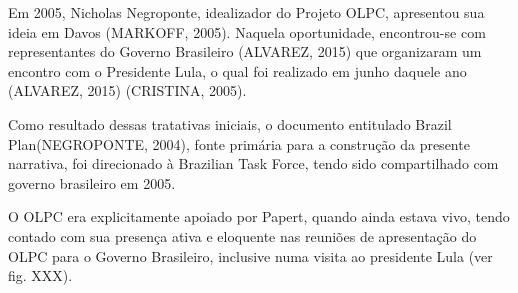 \documentclass[
12pt,		%
openright,	%
twoside,  %
a4paper,			%
chapter=TITLE,		%
english,			%
french,				%
spanish,			%
brazil				%
]{USPSC-classe/USPSC}
\begin{document}
Em 2005, Nicholas Negroponte, idealizador do Projeto OLPC, apresentou sua ideia em Davos (MARKOFF, 2005). Naquela oportunidade, encontrou-se com representantes do Governo Brasileiro (ALVAREZ, 2015) que organizaram um encontro com o Presidente Lula, o qual foi realizado em junho daquele ano (ALVAREZ, 2015) (CRISTINA, 2005).










Como resultado dessas tratativas iniciais, o documento entitulado \textquotedbl Brazil Plan\textquotedbl   (NEGROPONTE, 2004), fonte prim\'aria para a constru\c{c}\~ao da presente narrativa, foi direcionado \`a \textquotedbl Brazilian Task Force\textquotedbl , tendo sido compartilhado com governo brasileiro em 2005.










O OLPC era explicitamente apoiado por Papert, quando ainda estava vivo, tendo contado com sua presen\c{c}a ativa e eloquente nas reuni\~oes de apresenta\c{c}\~ao do OLPC para o Governo Brasileiro, inclusive numa visita ao presidente Lula (ver fig. XXX).
\end{document}
